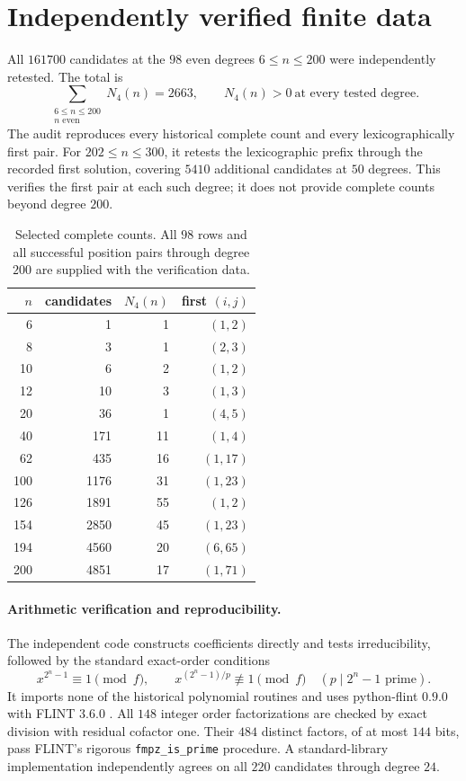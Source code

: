 \documentclass[11pt]{article}
\theoremstyle{definition}
\theoremstyle{remark}
\begin{document}
\section{Independently verified finite data}\label{sec:computations}
All $161700$ candidates at the $98$ even degrees $6\le n\le200$
were independently retested. The total is
\[
 \sum_{\substack{6\le n\le200\\ n\text{ even}}}N_4(n)=2663,
 \qquad N_4(n)>0\ \text{at every tested degree}.
\]
The audit reproduces every historical complete count and every
lexicographically first pair. For $202\le n\le300$, it retests the
lexicographic prefix through the recorded first solution, covering
$5410$ additional candidates at $50$ degrees. This verifies the
first pair at each such degree; it does not provide complete counts
beyond degree $200$.

\begin{table}[ht]
\centering\small
\begin{tabular}{rrrr}
\toprule
$n$ & candidates & $N_4(n)$ & first $(i,j)$\\
\midrule
6 & 1 & 1 & $(1,2)$\\
8 & 3 & 1 & $(2,3)$\\
10 & 6 & 2 & $(1,2)$\\
12 & 10 & 3 & $(1,3)$\\
20 & 36 & 1 & $(4,5)$\\
40 & 171 & 11 & $(1,4)$\\
62 & 435 & 16 & $(1,17)$\\
100 & 1176 & 31 & $(1,23)$\\
126 & 1891 & 55 & $(1,2)$\\
154 & 2850 & 45 & $(1,23)$\\
194 & 4560 & 20 & $(6,65)$\\
200 & 4851 & 17 & $(1,71)$\\
\bottomrule
\end{tabular}
\caption{Selected complete counts. All $98$ rows and all successful
position pairs through degree $200$ are supplied with the verification data.}
\label{tab:counts}
\end{table}

\paragraph{Arithmetic verification and reproducibility.}
The independent code constructs coefficients directly and tests
irreducibility, followed by the standard exact-order conditions
\begin{equation}\label{eq:ordertest}
 x^{2^n-1}\equiv1\pmod f,\qquad
 x^{(2^n-1)/p}\not\equiv1\pmod f\quad(p\mid2^n-1\text{ prime}).
\end{equation}
It imports none of the historical polynomial routines and uses
python-flint $0.9.0$ with FLINT $3.6.0$ \cite{Flint}.
All $148$ integer order factorizations are checked by exact division
with residual cofactor one. Their $484$ distinct factors, of at most
$144$ bits, pass FLINT's rigorous \texttt{fmpz\_is\_prime} procedure.
A standard-library implementation independently agrees on all $220$
candidates through degree $24$.
\end{document}
